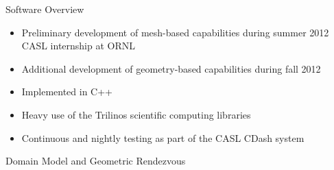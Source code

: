 \documentclass{beamer}
\begin{document}
\begin{frame}{Software Overview}

  \begin{itemize}
  \item Preliminary development of mesh-based capabilities during
    summer 2012 CASL internship at ORNL
    \medskip
  \item Additional development of geometry-based capabilities during
    fall 2012
    \medskip
  \item Implemented in C++
    \medskip
  \item Heavy use of the Trilinos scientific computing libraries
    \medskip
  \item Continuous and nightly testing as part of the CASL CDash
    system
  \end{itemize}
  
\end{frame}

\begin{frame}{Domain Model and Geometric Rendezvous}

\end{frame}
\end{document}
